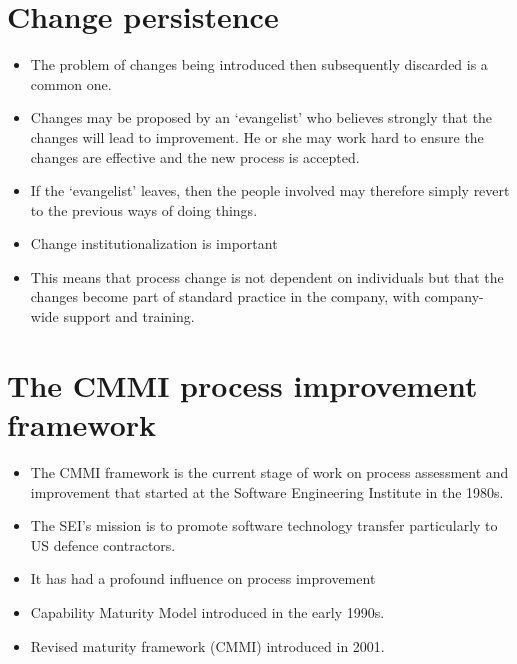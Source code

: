 \section{Change persistence}
\begin{itemize}

\item The problem of changes being introduced then subsequently discarded is a common one.

   \item Changes may be proposed by an ‘evangelist’ who believes strongly that the changes will lead to improvement. He or she may work hard to ensure the changes are effective and the new process is accepted.
   \item If the ‘evangelist’ leaves, then the people involved may therefore simply revert to the previous ways of doing things.

\item Change institutionalization is important

   \item This means that process change is not dependent on individuals but that the changes become part of standard practice in the company, with company-wide support and training.


\end{itemize}

\section{The CMMI process improvement framework}
\begin{itemize}
\item The CMMI framework is the current stage of work on process assessment and improvement that started at the Software Engineering Institute in the 1980s.

\item The SEI’s mission is to promote software technology transfer particularly to US defence contractors.

\item It has had a profound influence on process improvement    \item Capability Maturity Model introduced in the early 1990s.    \item Revised maturity framework (CMMI) introduced in 2001.



\end{itemize}

